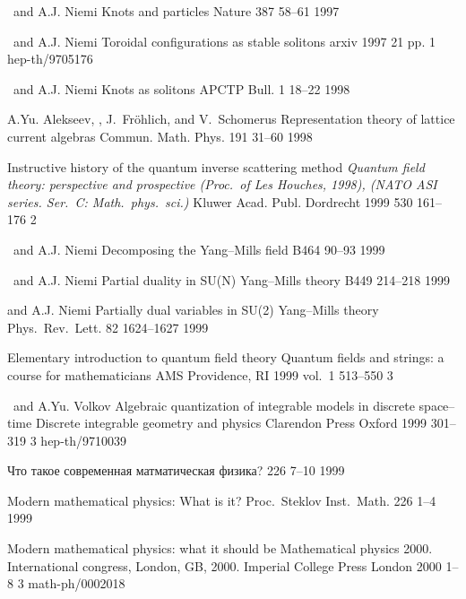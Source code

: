 {
{\LF\ and A.J. Niemi}
{Knots and particles} 
{Nature} {387} {} {58--61} {1997}

{\LF\ and A.J. Niemi}
{Toroidal configurations as stable solitons} 
{arxiv} {} {} {1997} {} {21 pp.} {1} {hep-th/9705176}

{\LF\ and A.J. Niemi}
{Knots as solitons}
{APCTP Bull.} {1} {} {18--22} {1998}

{A.Yu. Alekseev, \LF, J.~Fr{\"o}hlich, and V.~Schomerus}
{Representation theory of lattice current algebras}
{Commun. Math. Phys.} {191} {} {31--60} {1998}

{\LF}
{Instructive history of the quantum inverse scattering method}
{\em Quantum field theory: perspective and prospective
 (Proc.\ of Les Houches, 1998),
(NATO ASI series. Ser.~C: Math.\ phys.\ sci.)}
{Kluwer Acad. Publ.} {Dordrecht} {1999} {530} {161--176} {2} {}

{\LF\ and A.J. Niemi}
{Decomposing the {Y}ang--{M}ills field}
{\PL} {B464} {} {90--93} {1999}

{\LF\ and A.J. Niemi}
{Partial duality in SU(N) Yang--Mills theory}
{\PL} {B449} {} {214--218} {1999}

{\LF and A.J. Niemi}
{Partially dual variables in SU(2) Yang--Mills theory}
{Phys.\ Rev.\ Lett.} {82} {} {1624--1627} {1999}

{\LF}
{Elementary introduction to quantum field theory}
{Quantum fields and strings: a course for mathematicians}
{AMS} {Providence, RI}
{1999} {vol.~1} {513--550} {3} {}

{\LF\ and A.Yu. Volkov} 
{Algebraic quantization of integrable models in discrete space--time}
{Discrete integrable geometry and physics}
{Clarendon Press} {Oxford} {1999} {} {301--319} {3}
{hep-th/9710039}


{\LD}
{Что такое современная матматическая физика?}
{\Trudy} {226} {} {7--10} {1999}

{\LF}
{Modern mathematical physics: What is it?}
{Proc.\ Steklov Inst.\ Math.} {226} {1--4} {1999}

{\LF} 
{Modern mathematical physics: what it should be} 
{Mathematical physics 2000. International congress, London, GB, 2000.}
{Imperial College Press} {London} {2000} {} {1--8} {3}
{math-ph/0002018}

}
